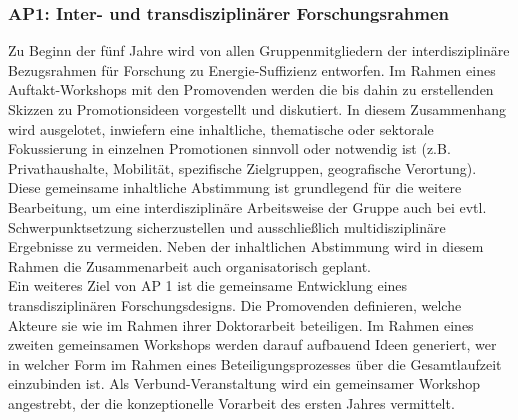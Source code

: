 \documentclass[a4paper,11pt,twoside]{scrartcl}
\begin{document}
\subsubsection*{AP1: Inter- und transdisziplinärer Forschungsrahmen}
Zu Beginn der fünf Jahre wird von allen Gruppenmitgliedern der interdisziplinäre Bezugsrahmen für Forschung zu Energie-Suffizienz %
entworfen. Im Rahmen eines Auftakt-Workshops mit den Promovenden werden die bis dahin zu erstellenden Skizzen zu Promotionsideen vorgestellt und diskutiert.
In diesem Zusammenhang wird ausgelotet, inwiefern eine inhaltliche, thematische oder sektorale Fokussierung in einzelnen Promotionen sinnvoll oder notwendig ist (z.B. Privathaushalte, Mobilität, spezifische Zielgruppen, geografische Verortung). Diese gemeinsame inhaltliche Abstimmung ist grundlegend für die weitere Bearbeitung, um eine interdisziplinäre Arbeitsweise der Gruppe auch bei evtl. Schwerpunktsetzung sicherzustellen und ausschließlich multidisziplinäre Ergebnisse zu vermeiden.
Neben der inhaltlichen Abstimmung wird in diesem Rahmen die Zusammenarbeit auch organisatorisch geplant.\\
Ein weiteres Ziel von AP 1 ist die gemeinsame Entwicklung eines transdisziplinären Forschungsdesigns. 
Die Promovenden definieren, welche Akteure sie wie im Rahmen ihrer Doktorarbeit beteiligen. %
Im Rahmen eines zweiten gemeinsamen Workshops werden darauf aufbauend Ideen generiert, wer in welcher Form im Rahmen eines Beteiligungsprozesses über die Gesamtlaufzeit einzubinden ist.
Als Verbund-Veranstaltung wird ein gemeinsamer Workshop angestrebt, der die konzeptionelle Vorarbeit des ersten Jahres vermittelt. %
\end{document}
